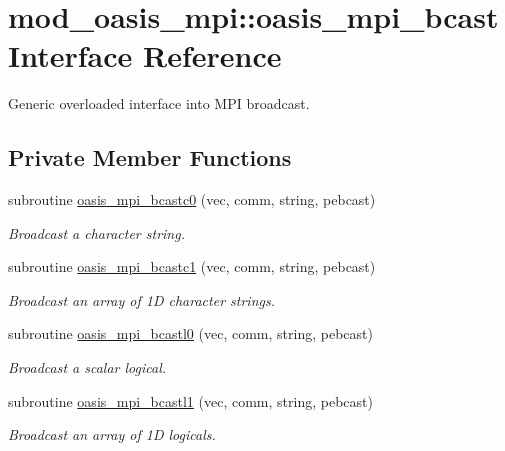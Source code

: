 \hypertarget{interfacemod__oasis__mpi_1_1oasis__mpi__bcast}{\section{mod\+\_\+oasis\+\_\+mpi\+:\+:oasis\+\_\+mpi\+\_\+bcast Interface Reference}
\label{interfacemod__oasis__mpi_1_1oasis__mpi__bcast}
}


Generic overloaded interface into M\+P\+I broadcast.  


\subsection*{Private Member Functions}
\begin{DoxyCompactItemize}
\item 
subroutine \hyperlink{interfacemod__oasis__mpi_1_1oasis__mpi__bcast_ae9e3dad3027638f11550c87f1a91f780}{oasis\+\_\+mpi\+\_\+bcastc0} (vec, comm, string, pebcast)
\begin{DoxyCompactList}\small\item\em Broadcast a character string. \end{DoxyCompactList}\item 
subroutine \hyperlink{interfacemod__oasis__mpi_1_1oasis__mpi__bcast_a074f77b4c72165e03e7955965e5a50bc}{oasis\+\_\+mpi\+\_\+bcastc1} (vec, comm, string, pebcast)
\begin{DoxyCompactList}\small\item\em Broadcast an array of 1\+D character strings. \end{DoxyCompactList}\item 
subroutine \hyperlink{interfacemod__oasis__mpi_1_1oasis__mpi__bcast_ae97f34e1ec8a66cce79cd18664ad108e}{oasis\+\_\+mpi\+\_\+bcastl0} (vec, comm, string, pebcast)
\begin{DoxyCompactList}\small\item\em Broadcast a scalar logical. \end{DoxyCompactList}\item 
subroutine \hyperlink{interfacemod__oasis__mpi_1_1oasis__mpi__bcast_aa2900064ce9079a6a2b4a8e55ff28ce7}{oasis\+\_\+mpi\+\_\+bcastl1} (vec, comm, string, pebcast)
\begin{DoxyCompactList}\small\item\em Broadcast an array of 1\+D logicals. \end{DoxyCompactList}\item 

\end{DoxyCompactItemize}
